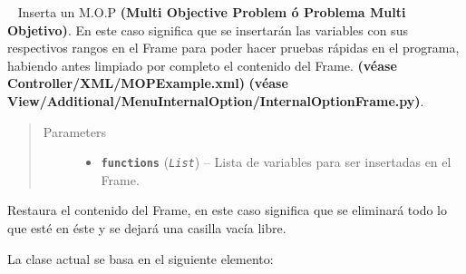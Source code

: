 \documentclass[class=report, crop=false]{standalone}
\begin{document}
\begin{fulllineitems}
\begin{fulllineitems}
\end{fulllineitems}

\begin{fulllineitems}

~
Inserta un M.O.P \textbf{(Multi Objective Problem ó Problema Multi Objetivo)}.\break
En este caso significa que se insertarán las variables con sus respectivos 
rangos en el Frame para poder hacer pruebas rápidas en el programa, habiendo 
antes limpiado por completo el contenido del Frame.\break
\textbf{(véase Controller/XML/MOPExample.xml)}\break
\textbf{(véase View/Additional/MenuInternalOption/InternalOptionFrame.py)}.\break

\begin{quote}\begin{description}
\item[{Parameters}] \leavevmode\begin{itemize}
\item \textbf{\texttt{functions}} (\emph{\texttt{List}}) -- Lista de variables para ser insertadas en el Frame.
\end{itemize}
\end{description}\end{quote}

\end{fulllineitems}

\begin{fulllineitems}

Restaura el contenido del Frame, en este caso significa que 
se eliminará todo lo que esté en éste y se dejará una casilla 
vacía libre.

\end{fulllineitems}

\end{fulllineitems}

La clase actual se basa en el siguiente elemento:
\end{document}
